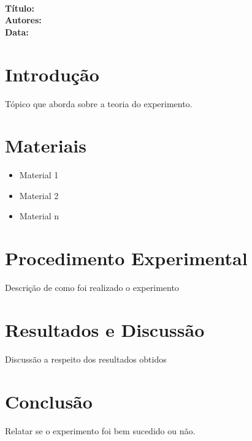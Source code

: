 \begin{apendicesenv}

\partapendices

\textbf{ \\
  Título:  \\
  Autores: \\
  Data:} \\

\section{Introdução}
	Tópico que aborda sobre a teoria do experimento.

\section{Materiais}
	\begin{itemize}
		\item Material 1
		\item Material 2
		\item Material n		
	\end{itemize}

\section{Procedimento Experimental}
	Descrição de como foi realizado o experimento

\section{Resultados e Discussão}
	Discussão a respeito dos resultados obtidos

\section{Conclusão}
	Relatar se o experimento foi bem sucedido ou não.

\noindent

\end{apendicesenv}
